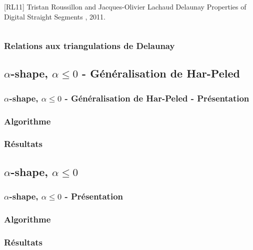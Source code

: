 \begin{frame}
\begin{columns}[t]
\begin{column}{0.5\linewidth}
\begin{thebibliography}{alpha}
      [RL11] Tristan Roussillon and Jacques-Olivier Lachaud
      \newblock Delaunay Properties of Digital Straight Segments
      , 2011.
     \end{thebibliography}
    \scriptsize     
  \end{column}
\end{columns}  

\end{frame}



\begin{frame}
\frametitle{Relations aux triangulations de Delaunay}

\end{frame}

\subsection{$\alpha$-shape, $\alpha \leq 0$ - Généralisation de Har-Peled}

\begin{frame}
\frametitle{$\alpha$-shape, $\alpha \leq 0$ - Généralisation de Har-Peled - Présentation}

\end{frame}

\begin{frame}
\frametitle{Algorithme}

\end{frame}

\begin{frame}
\frametitle{Résultats}

\end{frame}

\subsection{$\alpha$-shape, $\alpha \leq 0$}

\begin{frame}
\frametitle{$\alpha$-shape, $\alpha \leq 0$ - Présentation}

\end{frame}

\begin{frame}
\frametitle{Algorithme}

\end{frame}

\begin{frame}
\frametitle{Résultats}

\end{frame}


